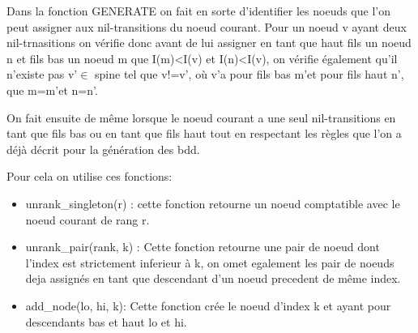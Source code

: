 \documentclass[french]{article}
\begin{document}
\begin{algorithm}
  \begin{algorithmic}[1]
    \Statex
            \State {}
                \State {}
                \State {}
            \EndIf
                \State {}
            \Else
                \State {}
                \State {}
                \State {}
            \EndIf
            \State {}
            \State {}
  \end{algorithmic}
\end{algorithm}


Dans la fonction GENERATE on fait en sorte d'identifier les noeuds que l'on peut assigner aux nil-transitions du noeud courant. Pour un noeud v ayant deux nil-trnasitions on vérifie donc avant de lui assigner en tant que haut fils un noeud n et fils bas un noeud m que I(m)<I(v) et I(n)<I(v), on vérifie également qu'il n'existe pas v\textquoteright \(\in\) spine tel que v!=v\textquoteright, où v\textquoteright a pour fils bas m\textquoteright et pour fils haut n\textquoteright, que m=m\textquoteright et n=n\textquoteright.

On fait ensuite de même lorsque le noeud courant a une seul nil-transitions en tant que fils bas ou en tant que fils haut tout en respectant les règles que l'on a déjà décrit pour la génération des bdd. 

Pour cela on utilise ces fonctions:
\begin{itemize}
    \item unrank\_singleton(r) : cette fonction retourne un noeud comptatible avec le noeud courant de rang r.
    \item unrank\_pair(rank, k) : Cette fonction retourne une pair de noeud dont l'index est strictement inferieur à k, on omet egalement les pair de noeuds deja assignés en tant que descendant d'un noeud precedent de même index.
    
    \item add\_node(lo, hi, k): Cette fonction crée le noeud d'index k et ayant pour descendants bas et haut lo et hi.
\end{itemize}
\end{document}
